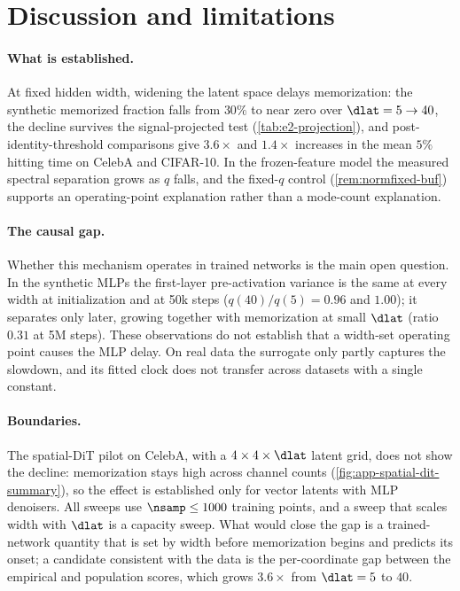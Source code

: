 \section{Discussion and limitations}
\label{sec:discussion}

\paragraph{What is established.}
At fixed hidden width, widening the latent space delays memorization: the synthetic memorized fraction falls from $30\%$ to near zero over $\dlat=5\to40$, the decline survives the signal-projected test (\cref{tab:e2-projection}), and post-identity-threshold comparisons give $3.6\times$ and $1.4\times$ increases in the mean $5\%$ hitting time on CelebA and CIFAR-10. In the frozen-feature model the measured spectral separation grows as $q$ falls, and the fixed-$q$ control (\cref{rem:normfixed-buf}) supports an operating-point explanation rather than a mode-count explanation.

\paragraph{The causal gap.}
Whether this mechanism operates in trained networks is the main open question. In the synthetic MLPs the first-layer pre-activation variance is the same at every width at initialization and at 50k steps ($q(40)/q(5)=0.96$ and $1.00$); it separates only later, growing together with memorization at small $\dlat$ (ratio $0.31$ at 5M steps). These observations do not establish that a width-set operating point causes the MLP delay. On real data the surrogate only partly captures the slowdown, and its fitted clock does not transfer across datasets with a single constant.

\paragraph{Boundaries.}
The spatial-DiT pilot on CelebA, with a $4\times4\times\dlat$ latent grid, does not show the decline: memorization stays high across channel counts (\cref{fig:app-spatial-dit-summary}), so the effect is established only for vector latents with MLP denoisers. All sweeps use $\nsamp\le1000$ training points, and a sweep that scales width with $\dlat$ is a capacity sweep. What would close the gap is a trained-network quantity that is set by width before memorization begins and predicts its onset; a candidate consistent with the data is the per-coordinate gap between the empirical and population scores, which grows $3.6\times$ from $\dlat=5$ to $40$.
